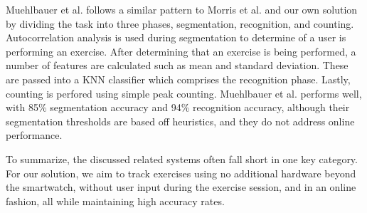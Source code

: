 Muehlbauer et al. \cite{muehlbauer} follows a similar pattern to Morris et al. \cite{recofit} and our own solution by dividing the task into three phases, segmentation, recognition, and counting. Autocorrelation analysis is used during segmentation to determine of a user is performing an exercise. After determining that an exercise is being performed, a number of features are calculated such as mean and standard deviation. These are passed into a KNN classifier which comprises the recognition phase. Lastly, counting is perfored using simple peak counting. Muehlbauer et al. performs well, with 85\% segmentation accuracy and 94\% recognition accuracy, although their segmentation thresholds are based off heuristics, and they do not address online performance. 

To summarize, the discussed related systems often fall short in one key category. For our solution, we aim to track exercises using no additional hardware beyond the smartwatch, without user input during the exercise session, and in an online fashion, all while maintaining high accuracy rates. 